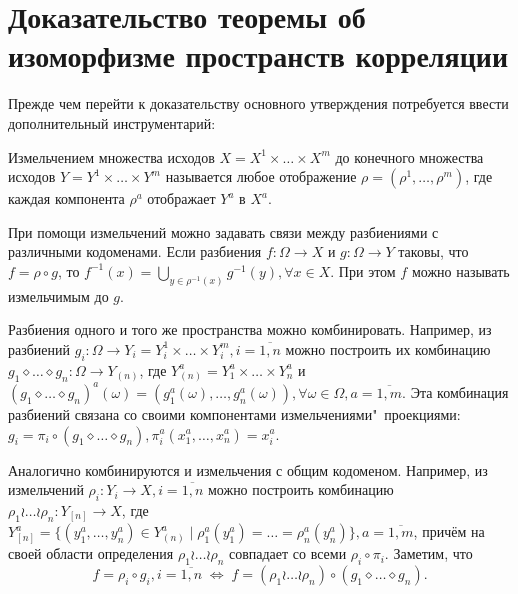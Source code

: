 \chapter{Доказательство теоремы об изоморфизме пространств корреляции}\label{app:B}

Прежде чем перейти к доказательству основного утверждения потребуется ввести дополнительный инструментарий:

\begin{definition}
	Измельчением множества исходов $X = X^1 \times \ldots \times X^m$ до конечного множества исходов $Y = Y^1 \times \ldots \times Y^m$ называется любое отображение $\rho = (\rho^1, \ldots, \rho^m)$, где каждая компонента $\rho^a$ отображает $Y^a$ в $X^a$.
\end{definition}

При помощи измельчений можно задавать связи между разбиениями с различными кодоменами. Если разбиения $f : \Omega \rightarrow X$ и $g : \Omega \rightarrow Y$ таковы, что $f = \rho \circ g$, то $f^{-1}(x) = \bigcup_{y \in \rho^{-1}(x)} g^{-1}(y), \forall x \in X$. При этом $f$ можно называть измельчимым до $g$.

Разбиения одного и того же пространства можно комбинировать. Например, из разбиений $g_i : \Omega \rightarrow Y_i = Y_i^1 \times \ldots \times Y_i^m, i=\overline{1,n}$ можно построить их комбинацию $g_1 \diamond \ldots \diamond g_n : \Omega \rightarrow Y_{(n)}$, где $Y_{(n)}^a = Y_1^a \times \ldots \times Y_n^a$ и $(g_1 \diamond \ldots \diamond g_n)^a(\omega) = (g_1^a(\omega), \ldots, g_n^a(\omega)), \forall \omega \in \Omega, a =\overline{1,m}$. Эта комбинация разбиений связана со своими компонентами измельчениями"~проекциями: $g_i  = \pi_i \circ (g_1 \diamond \ldots \diamond g_n), \pi_i^a(x_1^a, \ldots, x_n^a) = x_i^a$.

Аналогично комбинируются и измельчения с общим кодоменом. Например, из измельчений $\rho_i : Y_i \rightarrow X, i=\overline{1,n}$ можно построить комбинацию $\rho_1 \wr \ldots \wr \rho_n : Y_{[n]} \rightarrow X$, где $Y_{[n]}^a = \{(y_1^a, \ldots, y_n^a) \in Y_{(n)}^a \mid \rho_1^a(y_1^a) = \ldots = \rho_n^a(y_n^a)\}, a =\overline{1,m}$, причём на своей области определения $\rho_1 \wr \ldots \wr \rho_n$ совпадает со всеми $\rho_i \circ \pi_i$. Заметим, что
\begin{equation*}
	f = \rho_i \circ g_i, i=\overline{1,n} \;\Leftrightarrow\; f = (\rho_1 \wr \ldots \wr \rho_n) \circ (g_1 \diamond \ldots \diamond g_n).
\end{equation*}

